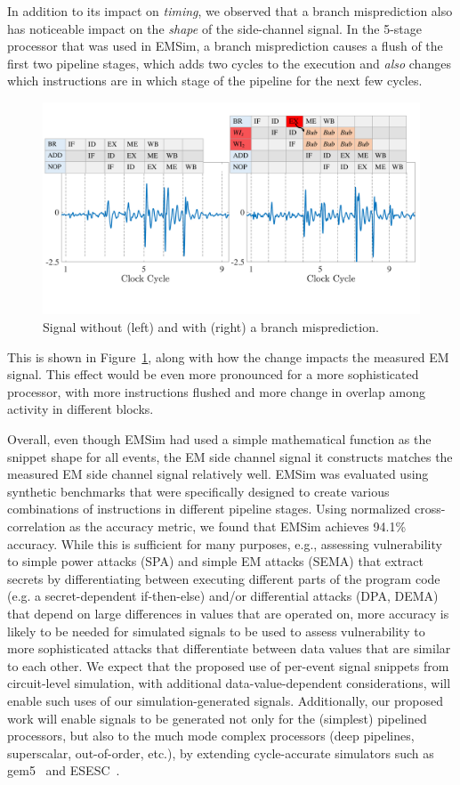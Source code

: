 In addition to its impact on \emph{timing}, we observed that a branch misprediction also has noticeable impact on the \emph{shape} of the side-channel signal. In the 5-stage processor that was used in EMSim, a branch misprediction causes a flush of the first two pipeline stages, which adds two cycles to the execution and \emph{also} changes which instructions are in which stage of the pipeline for the next few cycles.
\begin{figure}
	\includegraphics[width=0.5\columnwidth,clip]{figure/mise2.pdf}
\vspace{-0.3in}
	\caption{Signal without (left) and with (right) a branch misprediction.}
	\label{fig:mis}
   \vspace{-0.1in}
\end{figure}
 This is shown in Figure~\ref{fig:mis}, along with how the change impacts the measured EM signal.
This effect would be even more pronounced for a more sophisticated processor, with more instructions flushed and more change in overlap among activity in different blocks.

Overall, even though EMSim had used a simple mathematical function as the snippet shape for all events, the EM side channel signal it constructs matches the measured EM side channel signal relatively well. EMSim was evaluated using synthetic benchmarks that were specifically designed to create various combinations of instructions in different pipeline stages. Using normalized cross-correlation as the accuracy metric, we found that EMSim achieves 94.1\% accuracy. While this is sufficient for many purposes, e.g., assessing vulnerability to simple power attacks (SPA) and simple EM attacks (SEMA) that extract secrets by differentiating between executing different parts of the program code (e.g. a secret-dependent if-then-else) and/or differential attacks (DPA, DEMA) that depend on large differences in values that are operated on, more accuracy is likely to be needed for simulated signals to be used to assess vulnerability to more sophisticated attacks that differentiate between data values that are similar to each other. We expect that the proposed use of per-event signal snippets from circuit-level simulation, with additional data-value-dependent considerations, will enable such uses of our simulation-generated signals. Additionally, our proposed work will enable signals to be generated not only for the (simplest) pipelined processors, but also to the much mode complex processors (deep pipelines, superscalar, out-of-order, etc.), by extending cycle-accurate simulators such as gem5~\cite{Binkert:2011:GS:2024716.2024718} and ESESC~\cite{esesc}.

